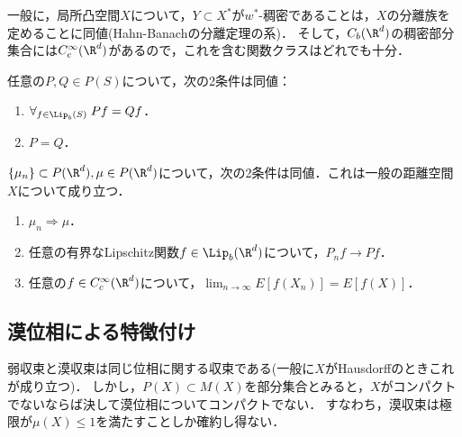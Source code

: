 \documentclass[uplatex,dvipdfmx]{jsreport}
\begin{document}
\begin{tcolorbox}[colframe=ForestGreen, colback=ForestGreen!10!white,breakable,colbacktitle=ForestGreen!40!white,coltitle=black,fonttitle=\bfseries\sffamily,
title=]
    一般に，局所凸空間$X$について，$Y\subset X^*$が$w^*$-稠密であることは，$X$の分離族を定めることに同値(Hahn-Banachの分離定理の系)．
    そして，$C_b(\R^d)$の稠密部分集合には$C_c^\infty(\R^d)$があるので，これを含む関数クラスはどれでも十分．
\end{tcolorbox}

\begin{theorem}[有界Lipschitz連続関数は確率測度の分離族である]
    任意の$P,Q\in P(S)$について，次の2条件は同値：
    \begin{enumerate}
        \item $\forall_{f\in \Lip_b(S)}\;Pf=Qf$．
        \item $P=Q$．
    \end{enumerate}
\end{theorem}

\begin{corollary}[弱収束の特徴付け]
    $\{\mu_n\}\subset P(\R^d),\mu\in P(\R^d)$について，次の2条件は同値．これは一般の距離空間$X$について成り立つ．
    \begin{enumerate}
        \item $\mu_n\Rightarrow\mu$．
        \item 任意の有界なLipschitz関数$f\in \Lip_b(\R^d)$について，$P_nf\to Pf$．
        \item 任意の$f\in C^\infty_c(\R^d)$について，$\lim_{n\to\infty}E[f(X_n)]=E[f(X)]$．
    \end{enumerate}
\end{corollary}

\subsection{漠位相による特徴付け}

\begin{tcolorbox}[colframe=ForestGreen, colback=ForestGreen!10!white,breakable,colbacktitle=ForestGreen!40!white,coltitle=black,fonttitle=\bfseries\sffamily,
title=]
    弱収束と漠収束は同じ位相に関する収束である(一般に$X$がHausdorffのときこれが成り立つ)．
    しかし，$P(X)\subset M(X)$を部分集合とみると，$X$がコンパクトでないならば決して漠位相についてコンパクトでない．
    すなわち，漠収束は極限が$\mu(X)\le1$を満たすことしか確約し得ない．
\end{tcolorbox}
\end{document}
